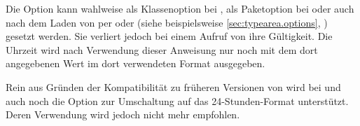 Die Option kann wahlweise als Klassenoption bei
, als Paketoption bei
 oder auch nach dem Laden von
 per  oder
 (siehe beispielsweise
\autoref{sec:typearea.options}, )
gesetzt werden. Sie verliert jedoch bei einem Aufruf von
 ihre Gültigkeit. Die Uhrzeit wird nach
Verwendung dieser Anweisung nur noch mit dem dort angegebenen Wert im dort
verwendeten Format ausgegeben.

Rein aus Gründen der Kompatibilität zu früheren Versionen
von  wird bei  und
 auch noch die Option  zur
Umschaltung auf das 24-Stunden-Format unterstützt. Deren Verwendung wird
jedoch nicht mehr empfohlen.%
\EndIndexGroup
%
\EndIndexGroup


